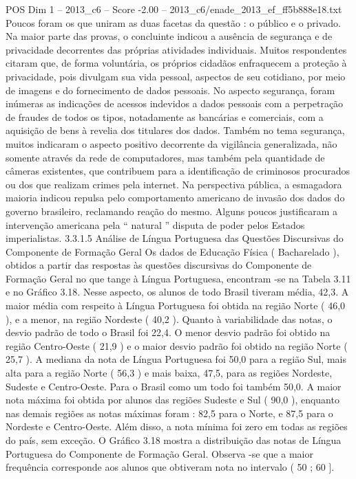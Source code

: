 \begin{textsample}{POS Dim 1 – 2013\_c6 – Score -2.00 – 2013\_c6/enade\_2013\_ef\_ff5b888e18.txt}
Poucos foram os que uniram as duas facetas da questão : o público e o privado.
Na maior parte das provas, o concluinte indicou a ausência de segurança e de privacidade decorrentes das próprias atividades individuais.
Muitos respondentes citaram que, de forma voluntária, os próprios cidadãos enfraquecem a proteção à privacidade, pois divulgam sua vida pessoal, aspectos de seu cotidiano, por meio de imagens e do fornecimento de dados pessoais.
No aspecto segurança, foram inúmeras as indicações de acessos indevidos a dados pessoais com a perpetração de fraudes de todos os tipos, notadamente as bancárias e comerciais, com a aquisição de bens à revelia dos titulares dos dados.
Também no tema segurança, muitos indicaram o aspecto positivo decorrente da vigilância generalizada, não somente através da rede de computadores, mas também pela quantidade de câmeras existentes, que contribuem para a identificação de criminosos procurados ou dos que realizam crimes pela internet.
Na perspectiva pública, a esmagadora maioria indicou repulsa pelo comportamento americano de invasão dos dados do governo brasileiro, reclamando reação do mesmo.
Alguns poucos justificaram a intervenção americana pela “ natural ” disputa de poder pelos Estados imperialistas. 3.3.1.5 Análise de Língua Portuguesa das Questões Discursivas do Componente de Formação Geral Os dados de Educação Física ( Bacharelado ), obtidos a partir das respostas às questões discursivas do Componente de Formação Geral no que tange à Língua Portuguesa, encontram -se na Tabela 3.11 e no Gráfico 3.18.
Nesse aspecto, os alunos de todo Brasil tiveram média, 42,3.
A maior média com respeito à Língua Portuguesa foi obtida na região Norte ( 46,0 ), e a menor, na região Nordeste ( 40,2 ).
Quanto à variabilidade das notas, o desvio padrão de todo o Brasil foi 22,4.
O menor desvio padrão foi obtido na região Centro-Oeste ( 21,9 ) e o maior desvio padrão foi obtido na região Norte ( 25,7 ).
A mediana da nota de Língua Portuguesa foi 50,0 para a região Sul, mais alta para a região Norte ( 56,3 ) e mais baixa, 47,5, para as regiões Nordeste, Sudeste e Centro-Oeste.
Para o Brasil como um todo foi também 50,0.
A maior nota máxima foi obtida por alunos das regiões Sudeste e Sul ( 90,0 ), enquanto nas demais regiões as notas máximas foram : 82,5 para o Norte, e 87,5 para o Nordeste e Centro-Oeste.
Além disso, a nota mínima foi zero em todas as regiões do país, sem exceção.
O Gráfico 3.18 mostra a distribuição das notas de Língua Portuguesa do Componente de Formação Geral.
Observa -se que a maior frequência corresponde aos alunos que obtiveram nota no intervalo ( 50 ; 60 ].

\end{textsample}
